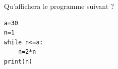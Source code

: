 \begin{exo}{}
	Qu'affichera le programme suivant ?

	\begin{lstlisting}
a=30
n=1
while n<=a:
    n=2*n
print(n)
\end{lstlisting}
\end{exo}
